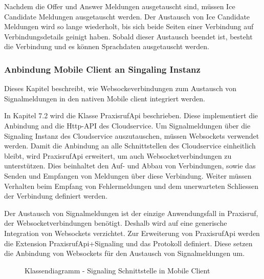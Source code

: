 Nachdem die Offer und Answer Meldungen ausgetauscht sind, müssen Ice Candidate Meldungen ausgetauscht werden.
Der Austausch von Ice Candidate Meldungen wird so lange wiederholt, bis sich beide Seiten einer Verbindung auf Verbindungsdetails geinigt haben.
Sobald dieser Austausch beendet ist, besteht die Verbindung und es können Sprachdaten ausgetauscht werden.

\clearpage

\subsubsection{Anbindung Mobile Client an Singaling Instanz}

Dieses Kapitel beschreibt, wie Websockeverbindungen zum Austausch von Signalmeldungen in den nativen Mobile client integriert werden.

In Kapitel 7.2 wird die Klasse PraxisrufApi beschrieben.
Diese implementiert die Anbindung and die Http-API des Cloudservice.
Um Signalmeldungen über die Signaling Instanz des Cloudservice auszutauschen, müssen Websockets verwendet werden.
Damit die Anbindung an alle Schnittstellen des Cloudservice einheitlich bleibt, wird PraxisrufApi erweitert, um auch Websocketverbindungen zu unterstützen.
Dies beinhaltet den Auf- und Abbau von Verbindungen, sowie das Senden und Empfangen von Meldungen über diese Verbindung.
Weiter müssen Verhalten beim Empfang von Fehlermeldungen und dem unerwarteten Schliessen der Verbindung definiert werden.

Der Austausch von Signalmeldungen ist der einzige Anwendungsfall in Praxisruf, der Websocketverbindungen benötigt.
Deshalb wird auf eine generische Integration von Websockets verzichtet.
Zur Erweiterung von PraxisrufApi werden die Extension PraxisrufApi+Signaling und das Protokoll definiert.
Diese setzen die Anbindung von Websockets für den Austausch von Signalmeldungen um.

\begin{figure}[h]
    \centering
    \begin{minipage}[b]{0.6\textwidth}
        \caption{Klassendiagramm - Signaling Schnittstelle in Mobile Client}
    \end{minipage}
\end{figure}

